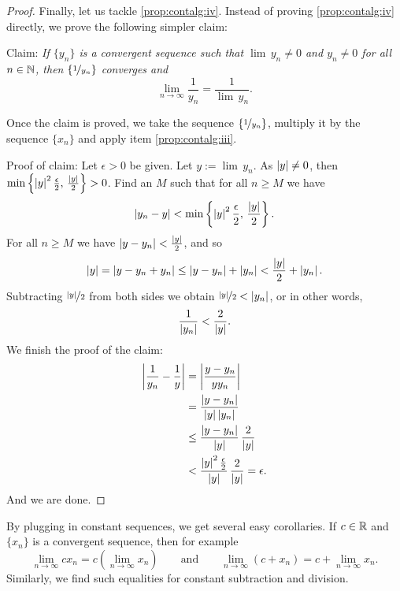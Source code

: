 \begin{proof}
Finally, let us tackle
\ref{prop:contalg:iv}.  Instead of proving 
\ref{prop:contalg:iv} directly, we prove the following simpler claim:

Claim: \emph{If $\{ y_n \}$ is a convergent sequence such that
$\lim\, y_n \not= 0$ and $y_n \not= 0$ for all $n \in {\mathbb{N}}$, then
$\{ \nicefrac{1}{y_n} \}$ converges and}
\begin{equation*}
\lim_{n\to\infty} \frac{1}{y_n} = \frac{1}{\lim\, y_n}  .
\end{equation*}

Once the claim is proved, we take the sequence $\{ \nicefrac{1}{y_n} \}$,
multiply it by the sequence $\{ x_n \}$ and apply item
\ref{prop:contalg:iii}.

Proof of claim:  Let $\epsilon > 0$ be given.
Let $y := \lim\, y_n$.
As $\left\lvert {y} \right\rvert \not= 0$, then
$\min \left\{ \left\lvert {y} \right\rvert^2\frac{\epsilon}{2}, \, \frac{\left\lvert {y} \right\rvert}{2} \right\} > 0$.
Find an $M$ such that for all $n \geq M$
we have
\begin{equation*}
\left\lvert {y_n - y} \right\rvert < \min \left\{ \left\lvert {y} \right\rvert^2\frac{\epsilon}{2}, \, \frac{\left\lvert {y} \right\rvert}{2}
\right\} .
\end{equation*}
For all $n \geq M$ we have
$\left\lvert {y - y_n} \right\rvert < \frac{\left\lvert {y} \right\rvert}{2}$, and so
\begin{equation*}
\left\lvert {y} \right\rvert = 
\left\lvert {y - y_n + y_n } \right\rvert \leq
\left\lvert {y - y_n} \right\rvert + \left\lvert { y_n } \right\rvert < \frac{\left\lvert {y} \right\rvert}{2} + \left\lvert {y_n} \right\rvert.
\end{equation*}
Subtracting $\nicefrac{\left\lvert {y} \right\rvert}{2}$ from both sides we obtain
$\nicefrac{\left\lvert {y} \right\rvert}{2} < \left\lvert {y_n} \right\rvert$, or in other words,
\begin{equation*}
\frac{1}{\left\lvert {y_n} \right\rvert} < \frac{2}{\left\lvert {y} \right\rvert} .
\end{equation*}
We finish the proof of the claim:
\begin{equation*}
\begin{split}
\left\lvert {\frac{1}{y_n} - \frac{1}{y}} \right\rvert &=
\left\lvert {\frac{y - y_n}{y y_n}} \right\rvert \\
& =
\frac{\left\lvert {y - y_n} \right\rvert}{\left\lvert {y} \right\rvert \left\lvert {y_n} \right\rvert} \\
& \leq
\frac{\left\lvert {y - y_n} \right\rvert}{\left\lvert {y} \right\rvert} \, \frac{2}{\left\lvert {y} \right\rvert} \\
& <
\frac{\left\lvert {y} \right\rvert^2 \frac{\epsilon}{2}}{\left\lvert {y} \right\rvert} \, \frac{2}{\left\lvert {y} \right\rvert}
= \epsilon .
\end{split}
\end{equation*}
And we are done.
\end{proof}

By plugging in constant sequences, we get several easy corollaries.
If $c \in {\mathbb{R}}$ and $\{ x_n \}$ is a convergent sequence, then
for example
\begin{equation*}
\lim_{n \to \infty} c x_n = 
c \left( \lim_{n \to \infty} x_n \right) \qquad
\text{and}
\qquad
\lim_{n \to \infty} (c + x_n) = 
c + \lim_{n \to \infty} x_n .
\end{equation*}
Similarly, we find such equalities for constant subtraction and division.

